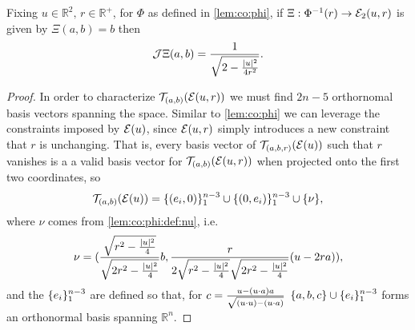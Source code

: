 \documentclass{article}
\newcommand{\R}[1]{\mathbb{R}^{#1}}
\newcommand{\optparens}[1]{\ifthenelse{\equal{#1}{}}{}{\parens{#1}}}
\newcommand{\E}[1]{\mathcal{E}\optparens{#1}}
\newcommand{\Et}[1]{\mathcal{E}_2\optparens{#1}}
\newcommand{\J}[1]{\mathcal{J}{#1}}
\newcommand{\T}[2]{\mathcal{T}_{#2}\parens{#1}}
\renewcommand{\dot}[2]{{#1}\cdot{#2}}
\newcommand{\pdot}[2]{\parens{\dot{#1}{#2}}}
\begin{document}
\begin{lemma}\label{lem:co:xi}%
  Fixing $u \in \R{2}, \, r \in \R{+}$, for $\Phi$ as defined in \ref{lem:co:phi}, if $\Xi : \Phi^{-1}(r) \to \Et{u, r}$ is given by $\Xi(a, b) = b$ then
  $$
  \J{\Xi}(a, b) = \frac{1}{\sqrt{2 - \frac{\abs{u}^2}{4r^2}}}.
  $$
\end{lemma}
\begin{proof}
  In order to characterize $\T{\E{u, r}}{(a,b)}$ we must find $2n - 5$ orthornomal basis vectors spanning the space. Similar to \ref{lem:co:phi} we can leverage the constraints imposed by $\E{u}$, since $\E{u, r}$ simply introduces a new constraint that $r$ is unchanging. That is, every basis vector of $\T{\E{u}}{(a, b, r)}$ such that $r$ vanishes is a a valid basis vector for $\T{\E{u, r}}{(a, b)}$ when projected onto the first two coordinates, so
  $$
  \T{\E{u}}{(a, b)} = \braces{(e_i, 0)}_1^{n-3} \cup \braces{(0, e_i)}_1^{n-3} \cup \braces{\nu},
  $$
  where $\nu$ comes from \eqref{lem:co:phi:def:nu}, i.e.
  \begin{equation}
    \nu = ( \frac{\sqrt{r^2 - \frac{\lvert u\rvert^2}{4}}}{\sqrt{2r^2 - \frac{\lvert u\rvert^2}{4}}} b, \frac{r}{2 \sqrt{r^2 - \frac{\lvert u\rvert^2}{4}} \sqrt{2r^2 - \frac{\lvert u\rvert^2}{4}}} (u - 2ra) ), \label{lem:co:xi:def:nu}
  \end{equation}
  and the $\{e_i\}_1^{n-3}$ are defined so that, for $c = \frac{u - \pdot{u}{a}a}{\sqrt{\pdot{u}{u} - \pdot{u}{a}}}$ $\{a, b, c\} \cup \{e_i\}_1^{n-3}$ forms an orthonormal basis spanning $\R{n}$.


\end{proof}
\end{document}
